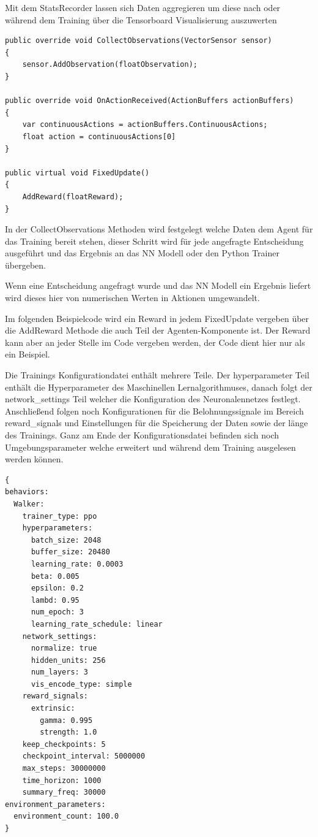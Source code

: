 Mit dem StatsRecorder lassen sich Daten aggregieren um diese nach oder während dem Training über die Tensorboard Visualisierung auszuwerten

\begin{lstlisting}[caption={Agent Funktionen},captionpos=b]
public override void CollectObservations(VectorSensor sensor)
{
    sensor.AddObservation(floatObservation);
}

public override void OnActionReceived(ActionBuffers actionBuffers)
{
    var continuousActions = actionBuffers.ContinuousActions;
    float action = continuousActions[0]
}

public virtual void FixedUpdate()
{
    AddReward(floatReward);
}
\end{lstlisting}

In der CollectObservations Methoden wird festgelegt welche Daten dem Agent für das Training bereit stehen, dieser Schritt wird für jede angefragte Entscheidung ausgeführt und das Ergebnis an das NN Modell oder den Python Trainer übergeben.

Wenn eine Entscheidung angefragt wurde und das NN Modell ein Ergebnis liefert wird dieses hier von numerischen Werten in Aktionen umgewandelt.

Im folgenden Beispielcode wird ein Reward in jedem FixedUpdate vergeben über die AddReward Methode die auch Teil der Agenten-Komponente ist. Der Reward kann aber an jeder Stelle im Code vergeben werden, der Code dient hier nur als ein Beispiel.

Die Trainings Konfigurationdatei enthält mehrere Teile. Der hyperparameter Teil enthält die Hyperparameter des Maschinellen Lernalgorithmuses, danach folgt der network\_settings Teil welcher die Konfiguration des Neuronalennetzes festlegt. Anschließend folgen noch Konfigurationen für die Belohnungssignale im Bereich reward\_signals und Einstellungen für die Speicherung der Daten sowie der länge des Trainings. Ganz am Ende der Konfigurationsdatei befinden sich noch Umgebungsparameter welche erweitert und während dem Training ausgelesen werden können.
\begin{lstlisting}[caption={Trainer Konfigurationsdatei},captionpos=b]
{
behaviors:
  Walker:
    trainer_type: ppo
    hyperparameters:
      batch_size: 2048
      buffer_size: 20480
      learning_rate: 0.0003
      beta: 0.005
      epsilon: 0.2
      lambd: 0.95
      num_epoch: 3
      learning_rate_schedule: linear
    network_settings:
      normalize: true
      hidden_units: 256
      num_layers: 3
      vis_encode_type: simple
    reward_signals:
      extrinsic:
        gamma: 0.995
        strength: 1.0
    keep_checkpoints: 5
    checkpoint_interval: 5000000
    max_steps: 30000000
    time_horizon: 1000
    summary_freq: 30000
environment_parameters:
  environment_count: 100.0
}
\end{lstlisting}
